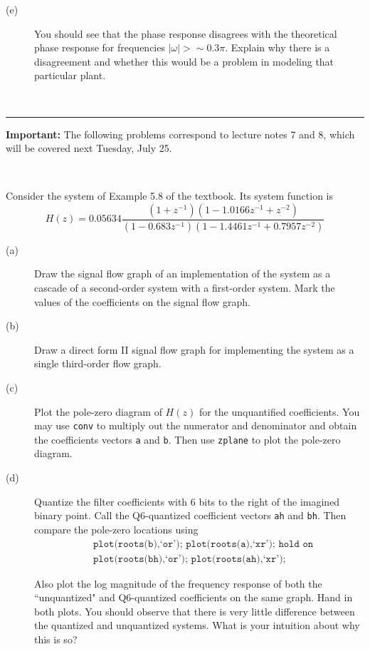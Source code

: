 \documentclass[12pt]{report}
\begin{document}
\begin{description}
	\item[(e)] You should see that the phase response disagrees with the theoretical phase response for frequencies $|\omega| > \sim 0.3\pi$. Explain why there is a disagreement and whether this would be a problem in modeling that particular plant. 
\end{description}

\mbox{}\\
\rule{6.5 in}{0.5pt}
\textbf{Important:} The following problems correspond to lecture notes 7 and 8, which will be covered next Tuesday, July 25.

\mbox{}\\

Consider the system of Example 5.8 of the textbook. Its system function is
\begin{equation}
H(z) = 0.05634\frac{(1+z^{-1})(1 -1.0166z^{-1} + z^{-2})}{(1-0.683z^{-1})(1 -1.4461z^{-1} + 0.7957z^{-2})}
\end{equation}

\begin{description}
	\item[(a)] Draw the signal flow graph of an implementation of the system as a cascade of a second-order system with a first-order system. Mark the values of the coefficients on the signal flow graph.
	\item[(b)] Draw a direct form II signal flow graph for implementing the system as a single third-order flow graph. 
	\item[(c)] Plot the pole-zero diagram of $H(z)$ for the unquantified coefficients. You may use \texttt{conv} to multiply out the numerator and denominator and obtain the coefficients vectors \texttt{a} and \texttt{b}. Then use \texttt{zplane} to plot the pole-zero diagram.
	\item[(d)] Quantize the filter coefficients with 6 bits to the right of the imagined binary point. Call the Q6-quantized coefficient vectors \texttt{ah} and \texttt{bh}. Then compare the pole-zero locations using
	\begin{align*}
		&\texttt{plot(roots(b),`or');~plot(roots(a),`xr'); hold on} \\
		&\texttt{plot(roots(bh),`or');~plot(roots(ah),`xr');}
	\end{align*}
	
	Also plot the log magnitude of the frequency response of both the ``unquantized" and Q6-quantized coefficients on the same graph. Hand in both plots. You should observe that there is very little difference between the quantized and unquantized systems. What is your intuition about why this is so?
	
\end{description}
\end{document}
